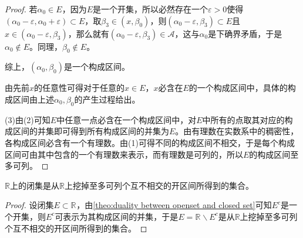 \begin{proof}
	若$\alpha_0\in E$，因为$E$是一个开集，所以必然存在一个$\varepsilon>0$使得$(\alpha_0-\varepsilon,\alpha_0+\varepsilon)\subset E$，取$\beta_3\in (x,\beta_0)$，则$(\alpha_0-\varepsilon,\beta_3)\subset E$且$x\in(\alpha_0-\varepsilon,\beta_3)$，那么就有$(\alpha_0-\varepsilon,\beta_3)\in \mathscr{A}$，这与$\alpha_0$是下确界矛盾，于是$\alpha_0\notin E$。同理，$\beta_0\notin E$。\par
	综上，$(\alpha_0,\beta_0)$是一个构成区间。\par
	由先前$x$的任意性可得对于任意的$x\in E$，$x$必含在$E$的一个构成区间中，具体的构成区间由上述$\alpha_0,\beta_0$的产生过程给出。\par
	(3)由(2)可知$E$中任意一点必含在一个构成区间中，对$E$中所有的点取其对应的构成区间的并集即可得到所有构成区间的并集为$E$。由有理数在实数系中的稠密性，各构成区间必含有一个有理数。由(1)可得不同的构成区间不相交，于是每个构成区间可由其中包含的一个有理数来表示，而有理数是可列的，所以$E$的构成区间至多可列。
\end{proof}
\begin{corollary}\label{cor:RClosedSetComponentInterval}
	$\mathbb{R}$上的闭集是从$\mathbb{R}$上挖掉至多可列个互不相交的开区间所得到的集合。
\end{corollary}
\begin{proof}
	设闭集$E\subset\mathbb{R}^{}$，由\cref{theo:duality between openset and closed set}可知$E^c$是一个开集，则$E^c$可表示为其构成区间的并集，于是$E=\mathbb{R}^{}\backslash E^c$是从$\mathbb{R}$上挖掉至多可列个互不相交的开区间所得到的集合。
\end{proof}

